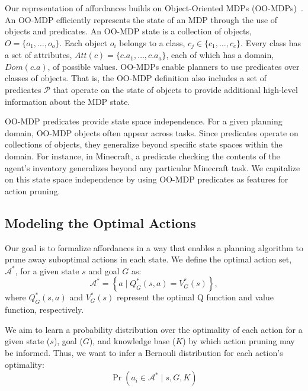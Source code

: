 \documentclass[letterpaper]{article}
\begin{document}
Our representation of affordances builds on Object-Oriented MDPs
(OO-MDPs)~\citep{diuk08}.  An OO-MDP efficiently represents the state
of an MDP through the use of objects and predicates.  An OO-MDP state
is a collection of objects, $O = \{o_1, \ldots, o_o \}$.  Each object
$o_i$ belongs to a class, $c_j \in \{c_1, \ldots, c_c\}$. Every class
has a set of attributes, $Att(c) = \{c.a_1, \ldots, c.a_a \}$, each of
which has a domain, $Dom(c.a)$, of possible values. OO-MDPs enable
planners to use predicates over classes of objects. That is, the
OO-MDP definition also includes a set of predicates $\mathcal{P}$ that
operate on the state of objects to provide additional high-level
information about the MDP state.

OO-MDP predicates provide state space independence. For a given planning domain, OO-MDP objects
often appear across tasks. Since predicates operate on collections
of objects, they generalize beyond specific state spaces within the domain.
For instance, in Minecraft, a predicate checking the contents of the agent's inventory
generalizes beyond any particular Minecraft task. We capitalize on this state space
independence by using OO-MDP predicates as features for action pruning.

\subsection{Modeling the Optimal Actions}


Our goal is to formalize affordances in a way that enables a planning
algorithm to prune away suboptimal actions in each state. We define
the optimal action set, $\mathcal{A}^*$, for a given state $s$ and
goal $G$ as:
\begin{equation}
\mathcal{A}^* = \left\{ a \mid Q^*_G(s,a) = V^*_G(s) \right\}, 
\label{eq:opt_act_set}
\end{equation}
where $Q^*_G(s,a)$ and $V^*_G(s)$ represent the optimal Q function and 
value function, respectively.

We aim to learn a probability distribution over the optimality of each action
for a given state ($s$), goal ($G$), and knowledge base ($K$) by which action pruning may be informed. Thus, we want to infer a Bernouli
distribution for each action's optimality:
\begin{equation}
\Pr(a_i \in \mathcal{A}^* \mid s, G, K)
\label{eq:master}
\end{equation}
\end{document}
